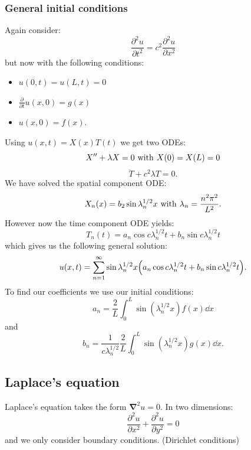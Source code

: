 \documentclass{article}
\begin{document}
\newpage

\subsubsection{General initial conditions}
Again consider:
$$\frac{\partial^2u}{\partial t^2}=c^2\frac{\partial^2u}{\partial x^2}$$
but now with the following conditions:
\begin{itemize}
    \item $u(0,t)=u(L,t)=0$
    \item $\displaystyle\frac{\partial}{\partial t}
    u(x,0)=g(x)$
    \item $u(x,0)=f(x)$.
\end{itemize}
Using $u(x,t)=X(x)T(t)$ we get two ODEs:
$$X''+\lambda X=0
\hspace{0.05in}\text{with}\hspace{0.05in}
X(0)=X(L)=0$$
$$\ddot{T}+c^2\lambda T=0.$$
We have solved the spatial component ODE:
$$X_n(x)=b_2\sin\lambda_n^{1/2}x
\hspace{0.05in}\text{with}\hspace{0.05in}
\lambda_n=\frac{n^2\pi^2}{L^2}.$$
However now the time component ODE yields:
$$T_n(t)=a_n\cos c\lambda_n^{1/2}t
+b_n\sin c\lambda_n^{1/2}t$$
which gives us the following general solution:
$$u(x,t)=\sum_{n=1}^{\infty}\sin\lambda_n^{1/2}x
\Bigl(a_n\cos c\lambda_n^{1/2}t
+b_n\sin c\lambda_n^{1/2}t\Bigr).$$
To find our coefficients we use our initial conditions:
$$a_n=\frac{2}{L}\int_{0}^{L}
\sin(\lambda_n^{1/2}x)f(x)\dd x$$
and
$$b_n=\frac{1}{c\lambda_n^{1/2}}\frac{2}{L}
\int_{0}^{L}\sin(\lambda_n^{1/2}x)g(x)\dd x.$$

\newpage

\subsection{Laplace's equation}
Laplace's equation takes the form $\boldsymbol{\nabla}^2 u=0$. In two dimensions:
$$\frac{\partial^2 u}{\partial x^2}+\frac{\partial^2 u}{\partial y^2}=0$$
and we only consider boundary conditions. (Dirichlet conditions)
\end{document}
